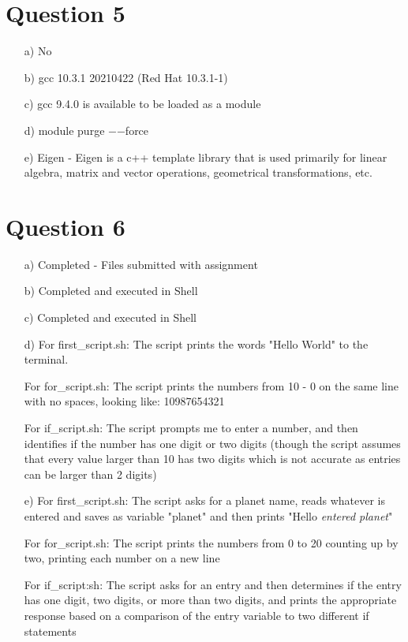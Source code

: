 \documentclass[11pt, oneside]{article}   	%
\begin{document}
\section*{Question 5}
\begin{enumerate}
\item[a)] No
\item[b)] gcc 10.3.1 20210422 (Red Hat 10.3.1-1)
\item[c)] gcc 9.4.0 is available to be loaded as a module
\item[d)] module purge $-$$-$force
\item[e)] Eigen - Eigen is a c++ template library that is used primarily for linear algebra, matrix and vector operations, geometrical transformations, etc.
\end{enumerate}

\section*{Question 6}
\begin{enumerate}
\item[a)] Completed - Files submitted with assignment
\item[b)] Completed and executed in Shell
\item[c)] Completed and executed in Shell
\item[d)] For first\_script.sh: The script prints the words "Hello World" to the terminal.

For for\_script.sh: The script prints the numbers from 10 - 0 on the same line with no spaces, looking like: 10987654321

For if\_script.sh: The script prompts me to enter a number, and then identifies if the number has one digit or two digits (though the script assumes that every value larger than 10 has two digits which is not accurate as entries can be larger than 2 digits)
\item[e)] For first\_script.sh: The script asks for a planet name, reads whatever is entered and saves as variable "planet" and then prints "Hello \emph{entered planet}"

For for\_script.sh: The script prints the numbers from 0 to 20 counting up by two, printing each number on a new line

For if\_script:sh: The script asks for an entry and then determines if the entry has one digit, two digits, or more than two digits, and prints the appropriate response based on a comparison of the entry variable to two different if statements

\end {enumerate}
\end{document}
